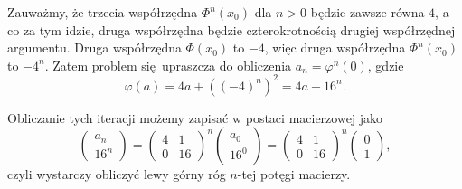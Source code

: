 \documentclass[a4paper, 12pt]{article}
\newcommand{\+}{\enspace}
\begin{document}
Zauważmy, że trzecia współrzędna $Φ^n(x_0)$ dla $n>0$ będzie zawsze równa $4$,
a co za tym idzie, druga współrzędna będzie czterokrotnością drugiej
współrzędnej argumentu.
Druga współrzędna $Φ(x_0)$ to $-4$, więc druga współrzędna $Φ^n(x_0)$ to $-4^n$.
Zatem problem się upraszcza do obliczenia $a_n = φ^n(0)$, gdzie
$$φ(a)
= 4a + ((-4)^n)^2 = 4a + 16^n.
$$

Obliczanie tych iteracji możemy zapisać w postaci macierzowej jako
$$
\begin{pmatrix}
	a_n \\
	16^n
\end{pmatrix}
=
\begin{pmatrix}
	4 & 1 \\
	0 & 16
\end{pmatrix}^n
\begin{pmatrix}
	a_0 \\
	16^0
\end{pmatrix}
=
\begin{pmatrix}
	4 & 1 \\
	0 & 16
\end{pmatrix}^n
\begin{pmatrix}
	0 \\
	1
\end{pmatrix},
$$
czyli wystarczy obliczyć lewy górny róg $n$-tej potęgi macierzy.
\end{document}
